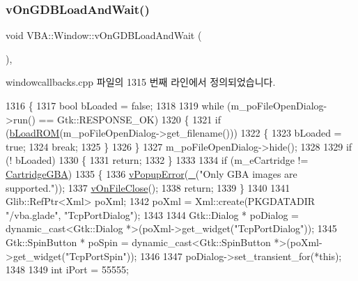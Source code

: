 \subsubsection{\texorpdfstring{v\+On\+G\+D\+B\+Load\+And\+Wait()}{vOnGDBLoadAndWait()}}
{\footnotesize\ttfamily void V\+B\+A\+::\+Window\+::v\+On\+G\+D\+B\+Load\+And\+Wait (\begin{DoxyParamCaption}{ }\end{DoxyParamCaption})\hspace{0.3cm}{\ttfamily [protected]}, {\ttfamily [virtual]}}



windowcallbacks.\+cpp 파일의 1315 번째 라인에서 정의되었습니다.


\begin{DoxyCode}
1316 \{
1317   \textcolor{keywordtype}{bool} bLoaded = \textcolor{keyword}{false};
1318 
1319   \textcolor{keywordflow}{while} (m\_poFileOpenDialog->run() == Gtk::RESPONSE\_OK)
1320   \{
1321     \textcolor{keywordflow}{if} (\mbox{\hyperlink{class_v_b_a_1_1_window_a69ddb41bd29d9f0db04175671ff2e2f4}{bLoadROM}}(m\_poFileOpenDialog->get\_filename()))
1322     \{
1323       bLoaded = \textcolor{keyword}{true};
1324       \textcolor{keywordflow}{break};
1325     \}
1326   \}
1327   m\_poFileOpenDialog->hide();
1328 
1329   \textcolor{keywordflow}{if} (! bLoaded)
1330   \{
1331     \textcolor{keywordflow}{return};
1332   \}
1333 
1334   \textcolor{keywordflow}{if} (m\_eCartridge != \mbox{\hyperlink{class_v_b_a_1_1_window_af580451d3ee7a738a73434858a08fa65a64f96d20685b8bd757b1996f9d0cd906}{CartridgeGBA}})
1335   \{
1336     \mbox{\hyperlink{class_v_b_a_1_1_window_afde18894816458e195f561b03ee2898c}{vPopupError}}(\mbox{\hyperlink{getopt_8c_a86a239addea586602343007a370bf8ad}{\_}}(\textcolor{stringliteral}{"Only GBA images are supported."}));
1337     \mbox{\hyperlink{class_v_b_a_1_1_window_a9bb969481b9cfea3b5b5bc157ccc0ff6}{vOnFileClose}}();
1338     \textcolor{keywordflow}{return};
1339   \}
1340 
1341   Glib::RefPtr<Xml> poXml;
1342   poXml = Xml::create(PKGDATADIR \textcolor{stringliteral}{"/vba.glade"}, \textcolor{stringliteral}{"TcpPortDialog"});
1343 
1344   Gtk::Dialog * poDialog = \textcolor{keyword}{dynamic\_cast<}Gtk::Dialog *\textcolor{keyword}{>}(poXml->get\_widget(\textcolor{stringliteral}{"TcpPortDialog"}));
1345   Gtk::SpinButton * poSpin = \textcolor{keyword}{dynamic\_cast<}Gtk::SpinButton *\textcolor{keyword}{>}(poXml->get\_widget(\textcolor{stringliteral}{"TcpPortSpin"}));
1346 
1347   poDialog->set\_transient\_for(*\textcolor{keyword}{this});
1348 
1349   \textcolor{keywordtype}{int} iPort = 55555;

\end{DoxyCode}
